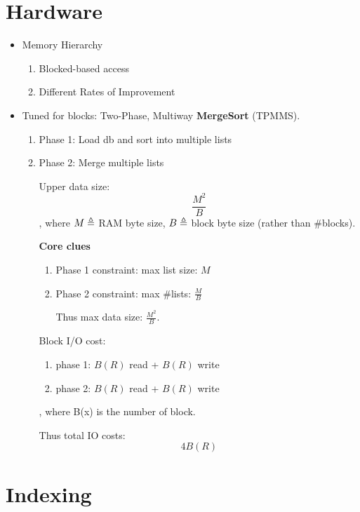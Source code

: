 \documentclass[a4paper]{report}
\begin{document}
\chapter{Hardware}
\begin{itemize}
\item Memory Hierarchy
\begin{enumerate}
\item Blocked-based access
\item Different Rates of Improvement
\end{enumerate}
\item Tuned for blocks: Two-Phase, Multiway \textbf{MergeSort} (TPMMS).
\begin{enumerate}
\item Phase 1: Load db and sort into multiple lists
\item Phase 2: Merge multiple lists

Upper data size:
$$
\frac{M^2}{B}
$$
, where $M\triangleq$ RAM byte size, $B\triangleq$ block byte size (rather than \#blocks).

\textbf{Core clues}
\begin{enumerate}
\item Phase 1 constraint: max list size: $M$
\item Phase 2 constraint: max \#lists: $\frac{M}{B}$

Thus max data size: $\frac{M^2}{B}$.
\end{enumerate}

Block I/O cost:
\begin{enumerate}
\item phase 1: $B(R)$ read + $B(R)$ write
\item phase 2: $B(R)$ read + $B(R)$ write
\end{enumerate}
, where B(x) is the number of block.

Thus total IO costs:
$$
4B(R)
$$
\end{enumerate}
\end{itemize}


\chapter{Indexing}
\end{document}
